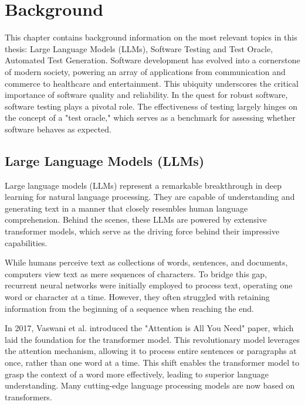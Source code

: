 \chapter{Background}
\label{cha:bg}
\vspace{0.4 cm}

This chapter contains background information on the most relevant topics in this thesis: Large Language Models (LLMs), Software Testing and Test Oracle, Automated Test Generation.
Software development has evolved into a cornerstone of modern society, powering an array of applications from communication and commerce to healthcare and entertainment. This ubiquity underscores the critical importance of software quality and reliability. In the quest for robust software, software testing plays a pivotal role. The effectiveness of testing largely hinges on the concept of a "test oracle," which serves as a benchmark for assessing whether software behaves as expected.

\section{Large Language Models (LLMs)}
\label{sec:llms}
\vspace{0.2 cm}

Large language models (LLMs) represent a remarkable breakthrough in deep learning for natural language processing. They are capable of understanding and generating text in a manner that closely resembles human language comprehension. Behind the scenes, these LLMs are powered by extensive transformer models, which serve as the driving force behind their impressive capabilities.

While humans perceive text as collections of words, sentences, and documents, computers view text as mere sequences of characters. To bridge this gap, recurrent neural networks were initially employed to process text, operating one word or character at a time. However, they often struggled with retaining information from the beginning of a sequence when reaching the end.

In 2017, Vaswani et al. introduced the "Attention is All You Need" paper, which laid the foundation for the transformer model. This revolutionary model leverages the attention mechanism, allowing it to process entire sentences or paragraphs at once, rather than one word at a time. This shift enables the transformer model to grasp the context of a word more effectively, leading to superior language understanding. Many cutting-edge language processing models are now based on transformers.

